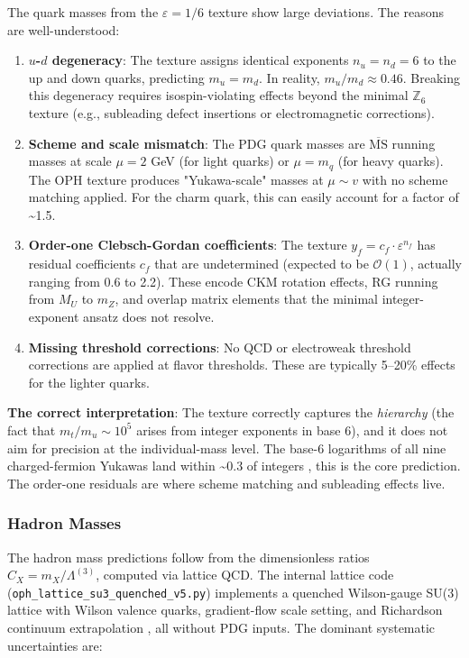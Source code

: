 The quark masses from the \(\varepsilon = 1/6\) texture show large deviations. The reasons are well-understood:

\begin{enumerate}
\def\labelenumi{\arabic{enumi}.}
\item
  \textbf{\(u\)-\(d\) degeneracy}: The texture assigns identical exponents \(n_u = n_d = 6\) to the up and down quarks, predicting \(m_u = m_d\). In reality, \(m_u/m_d \approx 0.46\). Breaking this degeneracy requires isospin-violating effects beyond the minimal \(\mathbb{Z}_6\) texture (e.g., subleading defect insertions or electromagnetic corrections).
\item
  \textbf{Scheme and scale mismatch}: The PDG quark masses are \(\overline{\text{MS}}\) running masses at scale \(\mu = 2\) GeV (for light quarks) or \(\mu = m_q\) (for heavy quarks). The OPH texture produces "Yukawa-scale" masses at \(\mu \sim v\) with no scheme matching applied. For the charm quark, this can easily account for a factor of \textasciitilde1.5.
\item
  \textbf{Order-one Clebsch-Gordan coefficients}: The texture \(y_f = c_f \cdot \varepsilon^{n_f}\) has residual coefficients \(c_f\) that are undetermined (expected to be \(\mathcal{O}(1)\), actually ranging from 0.6 to 2.2). These encode CKM rotation effects, RG running from \(M_U\) to \(m_Z\), and overlap matrix elements that the minimal integer-exponent ansatz does not resolve.
\item
  \textbf{Missing threshold corrections}: No QCD or electroweak threshold corrections are applied at flavor thresholds. These are typically 5--20\% effects for the lighter quarks.
\end{enumerate}

\textbf{The correct interpretation}: The texture correctly captures the \emph{hierarchy} (the fact that \(m_t/m_u \sim 10^5\) arises from integer exponents in base 6), and it does not aim for precision at the individual-mass level. The base-6 logarithms of all nine charged-fermion Yukawas land within \textasciitilde0.3 of integers , this is the core prediction. The order-one residuals are where scheme matching and subleading effects live.

\subsubsection{Hadron Masses}\label{114-hadron-masses}

The hadron mass predictions follow from the dimensionless ratios \(C_X = m_X/\Lambda^{(3)}\), computed via lattice QCD. The internal lattice code (\texttt{oph\_lattice\_su3\_quenched\_v5.py}) implements a quenched Wilson-gauge SU(3) lattice with Wilson valence quarks, gradient-flow scale setting, and Richardson continuum extrapolation , all without PDG inputs. The dominant systematic uncertainties are:

